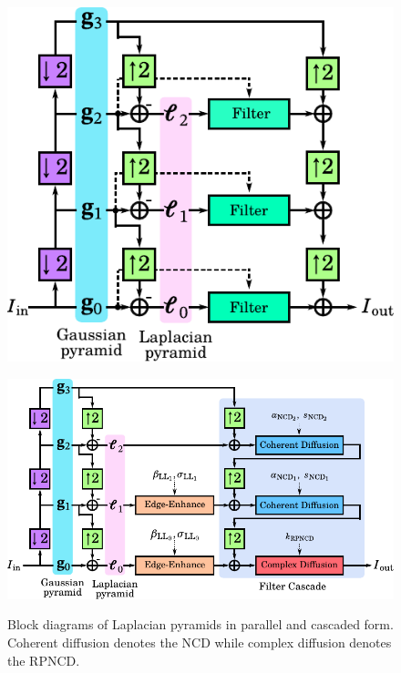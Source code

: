 \begin{figure}
  \centering
  \begin{minipage}[c]{0.43\textwidth}
    \centering
    \includegraphics[scale=0.75]{figures/conventional_laplacian_pyramid.pdf}
    \label{fig:lpnd}
  \end{minipage}
  \begin{minipage}[c]{0.53\textwidth}
    \centering
    \includegraphics[scale=0.75]{figures/multiscale_filter.pdf}
    \label{fig:clpd}
  \end{minipage}
  \caption{Block diagrams of Laplacian pyramids in parallel and cascaded form.
    Coherent diffusion denotes the NCD while complex diffusion denotes the RPNCD.
  }\label{fig:filters}
\end{figure}
%
